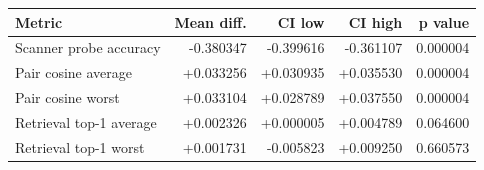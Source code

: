 \begin{tabular}{lrrrr}
\toprule
Metric & Mean diff. & CI low & CI high & p value \\
\midrule
Scanner probe accuracy & -0.380347 & -0.399616 & -0.361107 & 0.000004 \\
Pair cosine average & +0.033256 & +0.030935 & +0.035530 & 0.000004 \\
Pair cosine worst & +0.033104 & +0.028789 & +0.037550 & 0.000004 \\
Retrieval top-1 average & +0.002326 & +0.000005 & +0.004789 & 0.064600 \\
Retrieval top-1 worst & +0.001731 & -0.005823 & +0.009250 & 0.660573 \\
\bottomrule
\end{tabular}
